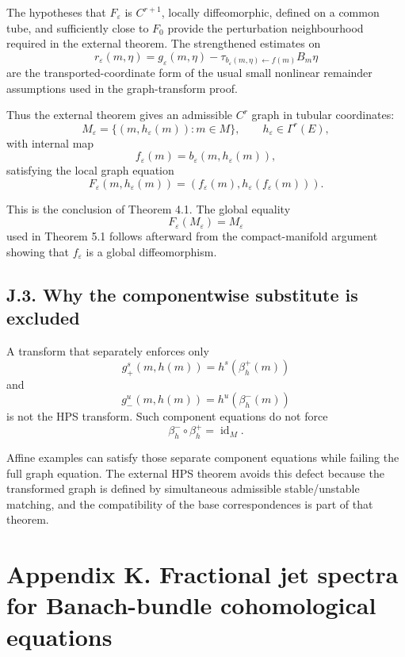 \documentclass[12pt,a4paper]{article}
\theoremstyle{plain}
\numberwithin{equation}{section}
\numberwithin{theorem}{section}
\begin{document}
The hypotheses that $F_\varepsilon$ is $C^{r+1}$, locally diffeomorphic, defined on a common tube, and sufficiently close to $F_0$ provide the perturbation neighbourhood required in the external theorem. The strengthened estimates on
\[
r_\varepsilon(m,\eta)
=
g_\varepsilon(m,\eta)
-
\tau_{b_\varepsilon(m,\eta)\leftarrow f(m)}B_m\eta
\]
are the transported-coordinate form of the usual small nonlinear remainder assumptions used in the graph-transform proof.

Thus the external theorem gives an admissible $C^r$ graph in tubular coordinates:
\[
M_\varepsilon=
\{(m,h_\varepsilon(m)):m\in M\},
\qquad
h_\varepsilon\in\Gamma^r(E),
\]
with internal map
\[
f_\varepsilon(m)=b_\varepsilon(m,h_\varepsilon(m)),
\]
satisfying the local graph equation
\[
F_\varepsilon(m,h_\varepsilon(m))
=
(f_\varepsilon(m),h_\varepsilon(f_\varepsilon(m))).
\]

This is the conclusion of Theorem 4.1. The global equality
\[
F_\varepsilon(M_\varepsilon)=M_\varepsilon
\]
used in Theorem 5.1 follows afterward from the compact-manifold argument showing that $f_\varepsilon$ is a global diffeomorphism.

\subsection{J.3. Why the componentwise substitute is excluded}

A transform that separately enforces only
\[
g_+^s(m,h(m))=h^s(\beta_h^+(m))
\]
and
\[
g_-^u(m,h(m))=h^u(\beta_h^-(m))
\]
is not the HPS transform. Such component equations do not force
\[
\beta_h^-\circ\beta_h^+=\operatorname{id}_M.
\]

Affine examples can satisfy those separate component equations while failing the full graph equation. The external HPS theorem avoids this defect because the transformed graph is defined by simultaneous admissible stable/unstable matching, and the compatibility of the base correspondences is part of that theorem.

\clearpage

\section{Appendix K. Fractional jet spectra for Banach-bundle cohomological equations}
\end{document}
